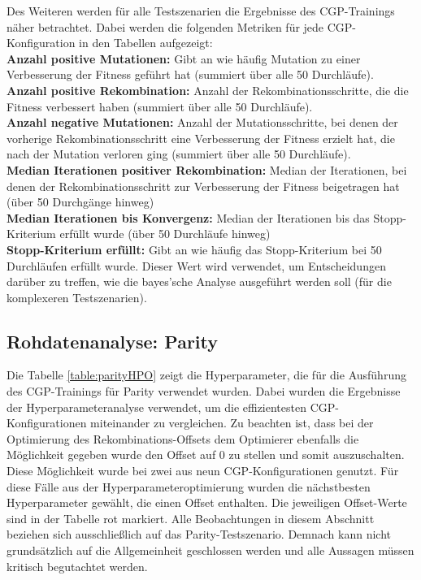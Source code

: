 Des Weiteren werden für alle Testszenarien die Ergebnisse des CGP-Trainings näher betrachtet.
Dabei werden die folgenden Metriken für jede CGP-Konfiguration in den Tabellen aufgezeigt:\\
\textbf{Anzahl positive Mutationen:} Gibt an wie häufig Mutation zu einer Verbesserung der Fitness geführt hat (summiert über alle 50 Durchläufe).\\
\textbf{Anzahl positive Rekombination:} Anzahl der Rekombinationsschritte, die die Fitness verbessert haben (summiert über alle 50 Durchläufe).\\
\textbf{Anzahl negative Mutationen:} Anzahl der Mutationsschritte, bei denen der vorherige Rekombinationsschritt eine Verbesserung der Fitness erzielt hat, die nach der Mutation verloren ging (summiert über alle 50 Durchläufe).\\
\textbf{Median Iterationen positiver Rekombination:} Median der Iterationen, bei denen der Rekombinationsschritt zur Verbesserung der Fitness beigetragen hat (über 50 Durchgänge hinweg)\\
\textbf{Median Iterationen bis Konvergenz:} Median der Iterationen bis das Stopp-Kriterium erfüllt wurde (über 50 Durchläufe hinweg)\\
\textbf{Stopp-Kriterium erfüllt:} Gibt an wie häufig das Stopp-Kriterium bei 50 Durchläufen erfüllt wurde. Dieser Wert wird verwendet, um Entscheidungen darüber zu treffen, wie die bayes'sche Analyse ausgeführt werden soll (für die komplexeren Testszenarien).

\subsection{Rohdatenanalyse: Parity}
\label{subsec:rohdatenParity}

Die Tabelle \ref{table:parityHPO} zeigt die Hyperparameter, die für die Ausführung des CGP-Trainings für Parity verwendet wurden.
Dabei wurden die Ergebnisse der Hyperparameteranalyse verwendet, um die effizientesten CGP-Konfigurationen miteinander zu vergleichen.
Zu beachten ist, dass bei der Optimierung des Rekombinations-Offsets dem Optimierer ebenfalls die Möglichkeit gegeben wurde den Offset auf 0 zu stellen und somit auszuschalten.
Diese Möglichkeit wurde bei zwei aus neun CGP-Konfigurationen genutzt.
Für diese Fälle aus der Hyperparameteroptimierung wurden die nächstbesten Hyperparameter gewählt, die einen Offset enthalten.
Die jeweiligen Offset-Werte sind in der Tabelle rot markiert.
Alle Beobachtungen in diesem Abschnitt beziehen sich ausschließlich auf das Parity-Testszenario.
Demnach kann nicht grundsätzlich auf die Allgemeinheit geschlossen werden und alle Aussagen müssen kritisch begutachtet werden.

